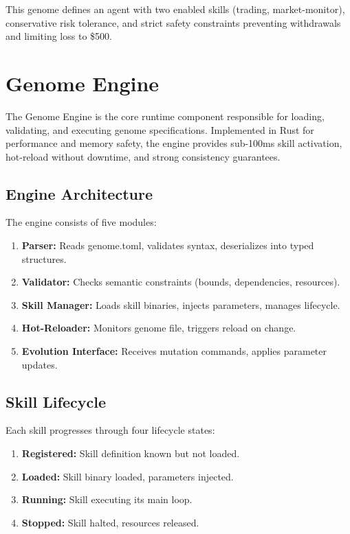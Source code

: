 \documentclass{article}
\begin{document}
This genome defines an agent with two enabled skills (trading, market-monitor), conservative risk tolerance, and strict safety constraints preventing withdrawals and limiting loss to \$500.



\section{Genome Engine}
\label{sec:genome_engine}

The Genome Engine is the core runtime component responsible for loading, validating, and executing genome specifications. Implemented in Rust for performance and memory safety, the engine provides sub-100ms skill activation, hot-reload without downtime, and strong consistency guarantees.

\subsection{Engine Architecture}

The engine consists of five modules:

\begin{enumerate}[leftmargin=*]
    \item \textbf{Parser:} Reads genome.toml, validates syntax, deserializes into typed structures.
    \item \textbf{Validator:} Checks semantic constraints (bounds, dependencies, resources).
    \item \textbf{Skill Manager:} Loads skill binaries, injects parameters, manages lifecycle.
    \item \textbf{Hot-Reloader:} Monitors genome file, triggers reload on change.
    \item \textbf{Evolution Interface:} Receives mutation commands, applies parameter updates.
\end{enumerate}

\subsection{Skill Lifecycle}

Each skill progresses through four lifecycle states:

\begin{enumerate}[leftmargin=*]
    \item \textbf{Registered:} Skill definition known but not loaded.
    \item \textbf{Loaded:} Skill binary loaded, parameters injected.
    \item \textbf{Running:} Skill executing its main loop.
    \item \textbf{Stopped:} Skill halted, resources released.
\end{enumerate}
\end{document}
